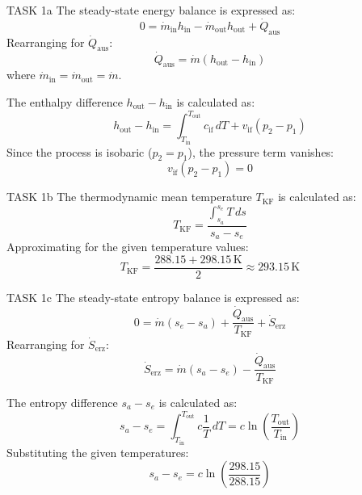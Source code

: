 TASK 1a  
The steady-state energy balance is expressed as:  
\[
0 = \dot{m}_{\text{in}} h_{\text{in}} - \dot{m}_{\text{out}} h_{\text{out}} + \dot{Q}_{\text{aus}}
\]  
Rearranging for \( \dot{Q}_{\text{aus}} \):  
\[
\dot{Q}_{\text{aus}} = \dot{m} (h_{\text{out}} - h_{\text{in}})
\]  
where \( \dot{m}_{\text{in}} = \dot{m}_{\text{out}} = \dot{m} \).  

The enthalpy difference \( h_{\text{out}} - h_{\text{in}} \) is calculated as:  
\[
h_{\text{out}} - h_{\text{in}} = \int_{T_{\text{in}}}^{T_{\text{out}}} c_{\text{if}} \, dT + v_{\text{if}} (p_2 - p_1)
\]  
Since the process is isobaric (\( p_2 = p_1 \)), the pressure term vanishes:  
\[
v_{\text{if}} (p_2 - p_1) = 0
\]  

TASK 1b  
The thermodynamic mean temperature \( T_{\text{KF}} \) is calculated as:  
\[
T_{\text{KF}} = \frac{\int_{s_a}^{s_e} T \, ds}{s_a - s_e}
\]  
Approximating for the given temperature values:  
\[
T_{\text{KF}} = \frac{288.15 + 298.15 \, \text{K}}{2} \approx 293.15 \, \text{K}
\]  

TASK 1c  
The steady-state entropy balance is expressed as:  
\[
0 = \dot{m} (s_e - s_a) + \frac{\dot{Q}_{\text{aus}}}{T_{\text{KF}}} + \dot{S}_{\text{erz}}
\]  
Rearranging for \( \dot{S}_{\text{erz}} \):  
\[
\dot{S}_{\text{erz}} = \dot{m} (s_a - s_e) - \frac{\dot{Q}_{\text{aus}}}{T_{\text{KF}}}
\]  

The entropy difference \( s_a - s_e \) is calculated as:  
\[
s_a - s_e = \int_{T_{\text{in}}}^{T_{\text{out}}} c \frac{1}{T} \, dT = c \ln \left( \frac{T_{\text{out}}}{T_{\text{in}}} \right)
\]  
Substituting the given temperatures:  
\[
s_a - s_e = c \ln \left( \frac{298.15}{288.15} \right)
\]